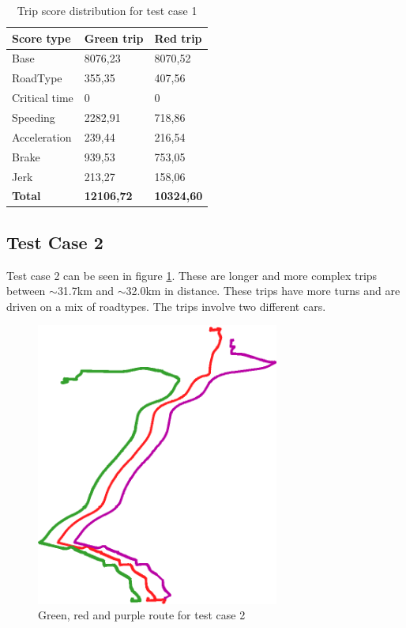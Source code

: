 \begin{table}
    \centering
    \begin{tabular}{lll}
    \textbf{Score type} & \textbf{Green trip} & \textbf{Red trip} \\ \hline
    Base                & 8076,23             & 8070,52           \\
    RoadType            & 355,35              & 407,56            \\
    Critical time       & 0                   & 0                 \\
    Speeding            & 2282,91             & 718,86            \\
    Acceleration        & 239,44              & 216,54            \\
    Brake               & 939,53              & 753,05            \\
    Jerk                & 213,27              & 158,06            \\ \hline
    \textbf{Total}      & \textbf{12106,72}   & \textbf{10324,60} \\ \hline
    \end{tabular}
    \caption{Trip score distribution for test case 1}
    \label{tab:shorttripscores}
\end{table}

\subsection{Test Case 2} \label{subsec:expe2}
Test case 2 can be seen in figure \ref{fig:longtrips}. These are longer and more complex trips between $\sim$31.7km and $\sim$32.0km in distance. These trips have more turns and are driven on a mix of roadtypes. The trips involve two different cars. 

\begin{figure}[tb]
    \centering
    \includegraphics[width=80mm]{Pictures/LongTrips.png}
    \caption{Green, red and purple route for test case 2}
    \label{fig:longtrips}
\end{figure}

